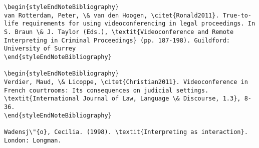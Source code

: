 \documentclass[output=paper]{langsci/langscibook}
\begin{document}
\begin{verbatim}
\begin{styleEndNoteBibliography}
van Rotterdam, Peter, \& van den Hoogen, \citet{Ronald2011}. True-to-life requirements for using videoconferencing in legal proceedings. In S. Braun \& J. Taylor (Eds.), \textit{Videoconference and Remote Interpreting in Criminal Proceedings} (pp. 187-198). Guildford: University of Surrey 
\end{styleEndNoteBibliography}

\begin{styleEndNoteBibliography}
Verdier, Maud, \& Licoppe, \citet{Christian2011}. Videoconference in French courtrooms: Its consequences on judicial settings. \textit{International Journal of Law, Language \& Discourse, 1.3}, 8-36. 
\end{styleEndNoteBibliography}

Wadensj\"{o}, Cecilia. (1998). \textit{Interpreting as interaction}. London: Longman.

\end{verbatim} 
\sloppy
\printbibliography[heading=subbibliography,notkeyword=this] 
\end{document}
